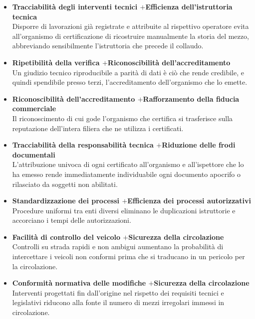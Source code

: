 \begin{itemize}
    \item \textbf{Tracciabilit\`a degli interventi tecnici \quad$+$\quad Efficienza dell'istruttoria tecnica}\\
    Disporre di lavorazioni gi\`a registrate e attribuite al rispettivo operatore evita all'organismo di certificazione di ricostruire manualmente la storia del mezzo, abbreviando sensibilmente l'istruttoria che precede il collaudo.

    \item \textbf{Ripetibilit\`a della verifica \quad$+$\quad Riconoscibilit\`a dell'accreditamento}\\
    Un giudizio tecnico riproducibile a parit\`a di dati \`e ci\`o che rende credibile, e quindi spendibile presso terzi, l'accreditamento dell'organismo che lo emette.

    \item \textbf{Riconoscibilit\`a dell'accreditamento \quad$+$\quad Rafforzamento della fiducia commerciale}\\
    Il riconoscimento di cui gode l'organismo che certifica si trasferisce sulla reputazione dell'intera filiera che ne utilizza i certificati.

    \item \textbf{Tracciabilit\`a della responsabilit\`a tecnica \quad$+$\quad Riduzione delle frodi documentali}\\
    L'attribuzione univoca di ogni certificato all'organismo e all'ispettore che lo ha emesso rende immediatamente individuabile ogni documento apocrifo o rilasciato da soggetti non abilitati.

    \item \textbf{Standardizzazione dei processi \quad$+$\quad Efficienza dei processi autorizzativi}\\
    Procedure uniformi tra enti diversi eliminano le duplicazioni istruttorie e accorciano i tempi delle autorizzazioni.

    \item \textbf{Facilit\`a di controllo del veicolo \quad$+$\quad Sicurezza della circolazione}\\
    Controlli su strada rapidi e non ambigui aumentano la probabilit\`a di intercettare i veicoli non conformi prima che si traducano in un pericolo per la circolazione.

    \item \textbf{Conformit\`a normativa delle modifiche \quad$+$\quad Sicurezza della circolazione}\\
    Interventi progettati fin dall'origine nel rispetto dei requisiti tecnici e legislativi riducono alla fonte il numero di mezzi irregolari immessi in circolazione.
\end{itemize}

